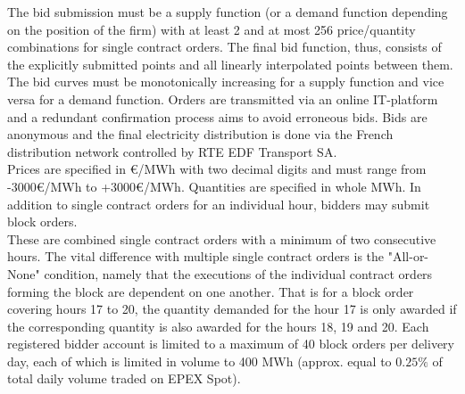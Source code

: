 The bid submission must be a supply function (or a demand function depending on the position of the firm) with at least 2 and at most 256 price/quantity combinations for single contract orders. The final bid function, thus, consists of the explicitly submitted points and all linearly interpolated points between them. The bid curves must be monotonically increasing for a supply function and vice versa for a demand function. Orders are transmitted via an online IT-platform and a redundant confirmation process aims to avoid erroneous bids. Bids are anonymous and the final electricity distribution is done via the French distribution network controlled by RTE EDF Transport SA.\\ 


Prices are specified in \euro{}/MWh with two decimal digits and must range from -3000\euro{}/MWh to +3000\euro{}/MWh. Quantities are specified in whole MWh. In addition to single contract orders for an individual hour, bidders may submit block orders. \\

These are combined single contract orders with a minimum of two consecutive hours. The vital difference with multiple single contract orders is the "All-or-None" condition, namely that the executions of the individual contract orders forming the block are dependent on one another. That is for a block order covering hours 17 to 20, the quantity demanded for the hour 17 is only awarded if the corresponding quantity is also awarded for the hours 18, 19 and 20. Each registered bidder account is limited to a maximum of 40 block orders per delivery day, each of which is limited in volume to 400 MWh (approx. equal to $0.25\%$ of total daily volume traded on EPEX Spot). \\

